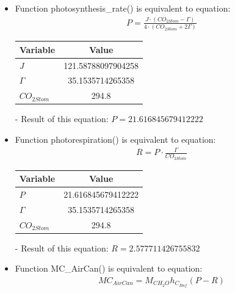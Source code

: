 \documentclass[a4paper]{article}
\numberwithin{equation}{section}
\begin{document}
\begin{itemize}
  \item Function photosynthesis\_rate() is equivalent to equation:
        \begin{align*}
          P = \frac{J \cdot (CO_{2Stom} - \Gamma)}{4 \cdot (CO_{2Stom} + 2\Gamma)}
        \end{align*}

        \begin{table}[H]
          \centering
          \begin{tabular}{@{}lS[table-format=3.15]@{}}
            \toprule
            \textbf{Variable} & \textbf{Value}     \\
            \midrule
            \(J\)             & 121.58788097904258 \\
            \(\Gamma\)        & 35.1535714265358   \\
            \(CO_{2Stom}\)    & 294.8              \\
            \bottomrule
          \end{tabular}
        \end{table}

  \item[-] Result of this equation: \(P = 21.616845679412222\)

  \item Function photorespiration() is equivalent to equation:
        \begin{align*}
          R = P \cdot \frac{\Gamma}{CO_{2Stom}}
        \end{align*}

        \begin{table}[H]
          \centering
          \begin{tabular}{@{}lS[table-format=3.15]@{}}
            \toprule
            \textbf{Variable} & \textbf{Value}     \\
            \midrule
            \(P\)             & 21.616845679412222 \\
            \(\Gamma\)        & 35.1535714265358   \\
            \(CO_{2Stom}\)    & 294.8              \\
            \bottomrule
          \end{tabular}
        \end{table}

  \item[-] Result of this equation: \(R = 2.577711426755832\)

  \item Function MC\_AirCan() is equivalent to equation:
        \begin{align*}
          MC_{AirCan} = M_{CH_2O} h_{C_{Buf}} (P - R)
        \end{align*}


\end{itemize}
\end{document}

